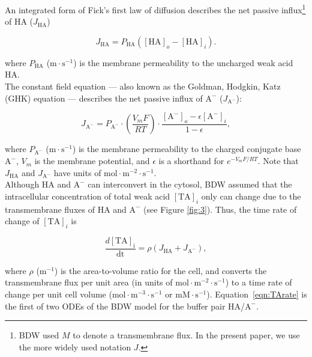 \documentclass[fleqn,10pt]{physiome}
\begin{document}
An integrated form of Fick's first law of diffusion describes the net passive influx\footnote{BDW used $M$ to denote a transmembrane flux. In the present paper, we use the more widely used notation $J$.} of $\mathrm{HA}$ ($J_\mathrm{HA}$)

\begin{equation}
J_\mathrm{HA}=P_\mathrm{HA}(\mathrm{[HA]}_o-\mathrm{[HA]}_i).
\label{eqn:J_HA}
\end{equation}

where $P_\mathrm{HA}$ ($\mathrm{m\cdot s^{-1}}$) is the membrane permeability to the uncharged weak acid $\mathrm{HA}$.\\

The constant field equation --- also known as the Goldman, Hodgkin, Katz (GHK) equation --- describes the net passive influx of $\mathrm{A^-}$ ($J_\mathrm{A^-}$):

\begin{equation}
J_\mathrm{A^-}=P_\mathrm{A^-}\cdot\left(\dfrac{V_mF}{RT}\right)\cdot\dfrac{\mathrm{[A^-]}_o-\epsilon\mathrm{[A^-]}_i}{1-\epsilon},
\label{eqn:J_A}
\end{equation}

where $P_\mathrm{A^-}$ ($\mathrm{m\cdot s^{-1}}$) is the membrane permeability to the charged conjugate base $\mathrm{A^-}$, $V_m$ is the membrane potential, and $\epsilon$ is a shorthand for \(e^{{-V_mF}/{RT}}\). Note that $J_\mathrm{HA}$ and $J_\mathrm{A^-}$ have units of $\mathrm{mol\cdot m^{-2}\cdot s^{-1}}$.\\

Although $\mathrm{HA}$ and $\mathrm{A^-}$ can interconvert in the cytosol, BDW assumed that the intracellular concentration of total weak acid $\mathrm{[TA]}_i$ only can change due to the transmembrane fluxes of $\mathrm{HA}$ and $\mathrm{A^-}$ (see Figure \ref{fig:3}). Thus, the time rate of change of $\mathrm{[TA]}_i$ is

\begin{equation}
\dfrac{d\mathrm{[TA]_i}}{\mathrm{dt}}=\rho\left(J_\mathrm{HA}+J_\mathrm{A^-}\right),
\label{eqn:TArate}
\end{equation}

where $\rho$ ($\mathrm{m^{-1}}$) is the area-to-volume ratio for the cell, and converts the transmembrane flux per unit area (in units of $\mathrm{mol\cdot m^{-2}\cdot s^{-1}}$) to a time rate of change per unit cell volume ($\mathrm{mol\cdot m^{-3}\cdot s^{-1}}$ or $\mathrm{mM\cdot s^{-1}}$). Equation~\ref{eqn:TArate} is the first of two ODEs of the BDW model for the buffer pair $\mathrm{HA}$/$\mathrm{A^-}$.\\
\end{document}
